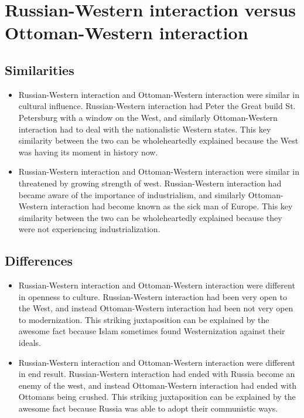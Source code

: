 \documentclass[letterpaper, 10pt]{article}
\begin{document}
        \section{Russian-Western interaction versus Ottoman-Western interaction}
            \subsection{Similarities}
                \begin{itemize}
                    \item Russian-Western interaction and Ottoman-Western interaction were similar in cultural influence. Russian-Western interaction had Peter the Great build St. Petersburg with a window on the West, and similarly Ottoman-Western interaction had to deal with the nationalistic Western states. This key similarity between the two can be wholeheartedly explained because the West was having its moment in history now.
                    \item Russian-Western interaction and Ottoman-Western interaction were similar in threatened by growing strength of west. Russian-Western interaction had became aware of the importance of industrialism, and similarly Ottoman-Western interaction had become known as the sick man of Europe. This key similarity between the two can be wholeheartedly explained because they were not experiencing industrialization.
                \end{itemize}
            \subsection{Differences}
                \begin{itemize}
                    \item Russian-Western interaction and Ottoman-Western interaction were different in openness to culture. Russian-Western interaction had been very open to the West, and instead Ottoman-Western interaction had been not very open to modernization. This striking juxtaposition can be explained by the awesome fact because Islam sometimes found Westernization against their ideals.
                    \item Russian-Western interaction and Ottoman-Western interaction were different in end result. Russian-Western interaction had ended with Russia become an enemy of the west, and instead Ottoman-Western interaction had ended with Ottomans being crushed. This striking juxtaposition can be explained by the awesome fact because Russia was able to adopt their communistic ways.
                \end{itemize}
\end{document}
